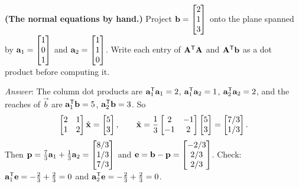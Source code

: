 \begin{exercise}\label{ch18:ex-normal-hand}
\textbf{(The normal equations by hand.)} Project $\mathbf{b}=\begin{bmatrix}2\\1\\3\end{bmatrix}$ onto the plane spanned
by $\mathbf{a}_1=\begin{bmatrix}1\\0\\1\end{bmatrix}$ and $\mathbf{a}_2=\begin{bmatrix}1\\1\\0\end{bmatrix}$. Write each entry of
$\mathbf{A}^{\mathsf{T}}\mathbf{A}$ and $\mathbf{A}^{\mathsf{T}}\mathbf{b}$ as a dot product before computing it.

\smallskip
\emph{Answer}: The column dot products are $\mathbf{a}_1^{\mathsf{T}}\mathbf{a}_1=2$, $\mathbf{a}_1^{\mathsf{T}}\mathbf{a}_2=1$,
$\mathbf{a}_2^{\mathsf{T}}\mathbf{a}_2=2$, and the reaches of $\vec{b}$ are $\mathbf{a}_1^{\mathsf{T}}\mathbf{b}=5$,
$\mathbf{a}_2^{\mathsf{T}}\mathbf{b}=3$. So
\[
  \begin{bmatrix} 2 & 1\\ 1 & 2\end{bmatrix}\hat{\mathbf{x}} = \begin{bmatrix}5\\3\end{bmatrix},
  \qquad
  \hat{\mathbf{x}} = \frac13\begin{bmatrix} 2 & -1\\ -1 & 2\end{bmatrix}\begin{bmatrix}5\\3\end{bmatrix}
  = \begin{bmatrix}7/3\\1/3\end{bmatrix}.
\]
Then $\mathbf{p}=\tfrac73\mathbf{a}_1+\tfrac13\mathbf{a}_2=\begin{bmatrix}8/3\\1/3\\7/3\end{bmatrix}$ and
$\mathbf{e}=\mathbf{b}-\mathbf{p}=\begin{bmatrix}-2/3\\2/3\\2/3\end{bmatrix}$. Check: $\mathbf{a}_1^{\mathsf{T}}\mathbf{e}=-\tfrac23+\tfrac23=0$
and $\mathbf{a}_2^{\mathsf{T}}\mathbf{e}=-\tfrac23+\tfrac23=0$.
\end{exercise}

